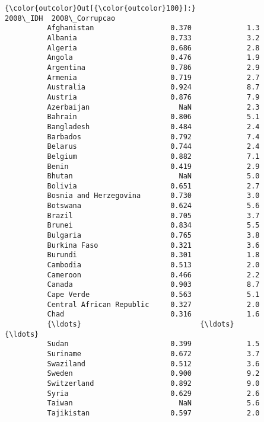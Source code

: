 \documentclass[11pt]{article}
\begin{document}
\begin{Verbatim}[commandchars=\\\{\}]
{\color{outcolor}Out[{\color{outcolor}100}]:}                           2008\_IDH  2008\_Corrupcao
          Afghanistan                  0.370             1.3
          Albania                      0.733             3.2
          Algeria                      0.686             2.8
          Angola                       0.476             1.9
          Argentina                    0.786             2.9
          Armenia                      0.719             2.7
          Australia                    0.924             8.7
          Austria                      0.876             7.9
          Azerbaijan                     NaN             2.3
          Bahrain                      0.806             5.1
          Bangladesh                   0.484             2.4
          Barbados                     0.792             7.4
          Belarus                      0.744             2.4
          Belgium                      0.882             7.1
          Benin                        0.419             2.9
          Bhutan                         NaN             5.0
          Bolivia                      0.651             2.7
          Bosnia and Herzegovina       0.730             3.0
          Botswana                     0.624             5.6
          Brazil                       0.705             3.7
          Brunei                       0.834             5.5
          Bulgaria                     0.765             3.8
          Burkina Faso                 0.321             3.6
          Burundi                      0.301             1.8
          Cambodia                     0.513             2.0
          Cameroon                     0.466             2.2
          Canada                       0.903             8.7
          Cape Verde                   0.563             5.1
          Central African Republic     0.327             2.0
          Chad                         0.316             1.6
          {\ldots}                            {\ldots}             {\ldots}
          Sudan                        0.399             1.5
          Suriname                     0.672             3.7
          Swaziland                    0.512             3.6
          Sweden                       0.900             9.2
          Switzerland                  0.892             9.0
          Syria                        0.629             2.6
          Taiwan                         NaN             5.6
          Tajikistan                   0.597             2.0

\end{Verbatim}
\end{document}
